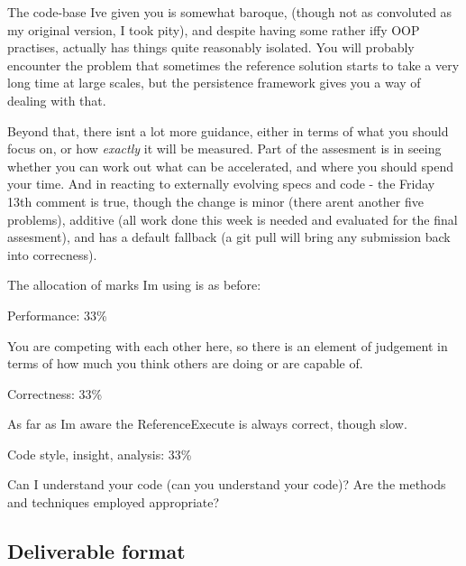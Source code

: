 The code-\/base I\textquotesingle{}ve given you is somewhat baroque, (though not as convoluted as my original version, I took pity), and despite having some rather iffy O\+O\+P practises, actually has things quite reasonably isolated. You will probably encounter the problem that sometimes the reference solution starts to take a very long time at large scales, but the persistence framework gives you a way of dealing with that.

Beyond that, there isn\textquotesingle{}t a lot more guidance, either in terms of what you should focus on, or how {\itshape exactly} it will be measured. Part of the assesment is in seeing whether you can work out what can be accelerated, and where you should spend your time. And in reacting to externally evolving specs and code -\/ the Friday 13th comment is true, though the change is minor (there aren\textquotesingle{}t another five problems), additive (all work done this week is needed and evaluated for the final assesment), and has a default fallback (a git pull will bring any submission back into correcness).

The allocation of marks I\textquotesingle{}m using is as before\+:


\begin{DoxyItemize}
\item Performance\+: 33\%
\begin{DoxyItemize}
\item You are competing with each other here, so there is an element of judgement in terms of how much you think others are doing or are capable of.
\end{DoxyItemize}
\item Correctness\+: 33\%
\begin{DoxyItemize}
\item As far as I\textquotesingle{}m aware the Reference\+Execute is always correct, though slow.
\end{DoxyItemize}
\item Code style, insight, analysis\+: 33\%
\begin{DoxyItemize}
\item Can I understand your code (can you understand your code)? Are the methods and techniques employed appropriate?
\end{DoxyItemize}
\end{DoxyItemize}

\subsection*{Deliverable format }


